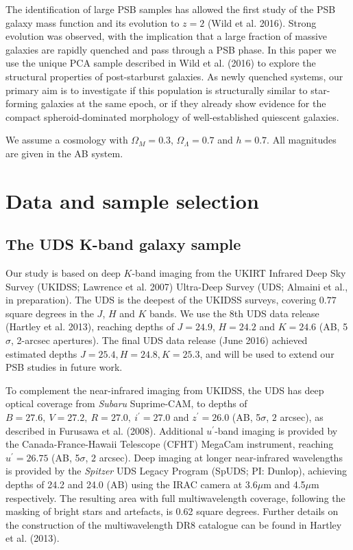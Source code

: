 \documentclass[a4paper,fleqn,usenatbib,useAMS]{mnras}
\begin{document}
The identification  of large PSB samples has allowed the first
study of  the PSB galaxy mass function and its evolution to
$z=2$ (Wild et al. 2016). Strong evolution was observed, with the
implication that a large fraction of massive galaxies are rapidly
quenched and pass through a PSB phase.  In this paper we use the
unique PCA sample described in Wild et al. (2016) to explore the
structural properties of post-starburst galaxies.  As newly quenched
systems, our primary aim is to investigate if this population is
structurally similar to star-forming galaxies at the same epoch, or if
they already show evidence for the compact spheroid-dominated
morphology of well-established quiescent galaxies.

We assume a cosmology with $\Omega_M=0.3$, $\Omega_\Lambda=0.7$ and
$h=0.7$.  All magnitudes are given in the AB system.





\section{Data and sample selection}

\subsection{The UDS K-band galaxy sample}

Our study is based on deep $K$-band imaging from the UKIRT Infrared Deep
Sky Survey (UKIDSS; Lawrence et al. 2007) Ultra-Deep Survey (UDS;
Almaini et al., in preparation). The UDS is the deepest of the UKIDSS surveys,
covering $0.77$ square degrees in the $J$, $H$ and $K$ bands.  We use
the 8th UDS data release (Hartley et al. 2013), reaching depths of
$J=24.9$, $H=24.2$ and $K=24.6$ (AB, 5$\sigma$, 2-arcsec
apertures). The final UDS data release (June 2016) achieved
estimated depths $J=25.4, H=24.8, K=25.3$, and will be used to extend
our PSB studies in future work.

To complement the near-infrared imaging from UKIDSS, the UDS has deep
optical coverage from {\it Subaru} Suprime-CAM, to depths of $B= 27.6,
~ V= 27.2, ~ R = 27.0, ~ i^{\prime} = 27.0$ and $ z^{\prime} = 26.0$
(AB, 5$\sigma$, $2$ arcsec), as described in Furusawa et
al. (2008). Additional $u^{\prime}$-band imaging is provided by the
Canada-France-Hawaii Telescope (CFHT) MegaCam instrument, reaching
$ u^{\prime} = 26.75$ (AB, 5$\sigma$, $2$ arcsec). Deep imaging
at longer near-infrared wavelengths is provided by the {\it Spitzer}
UDS Legacy Program (SpUDS; PI: Dunlop), achieving depths of 24.2 and
24.0 (AB) using the IRAC camera at 3.6$\mu$m and 4.5$\mu$m
respectively.  The resulting area with full multiwavelength coverage,
following the masking of bright stars and artefacts, is 0.62 square
degrees. Further details on the construction of the multiwavelength
DR8 catalogue can be found in Hartley et al. (2013).
\end{document}

